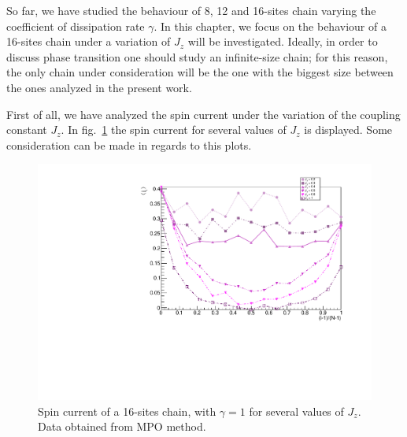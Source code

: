 So far, we have studied the behaviour of 8, 12 and 16-sites chain varying the coefficient of dissipation rate $\gamma$. In this chapter, we focus on the behaviour of a 16-sites chain under a variation of $J_z$ will be investigated. Ideally, in order to discuss phase transition one should study an infinite-size chain; for this reason, the only chain under consideration will be the one with the biggest size between the ones analyzed in the present work.

First of all, we have analyzed the spin current under the variation of the coupling constant $J_z$. In fig.~\ref{fig:16sites_SpinCurrVaryingJz} the spin current for several values of $J_z$ is displayed. Some consideration can be made in regards to this plots.




\begin{figure}[H]
    \centering
    \includegraphics[scale=0.7]{Figures/16sites/16sites_SpinCurrVaryingJz.pdf}
    \captionsetup{width=1.\linewidth}
    \caption{Spin current of a 16-sites chain, with $\gamma = 1$ for several values of $J_z$. Data obtained from MPO method.}
    \label{fig:16sites_SpinCurrVaryingJz}
\end{figure}

